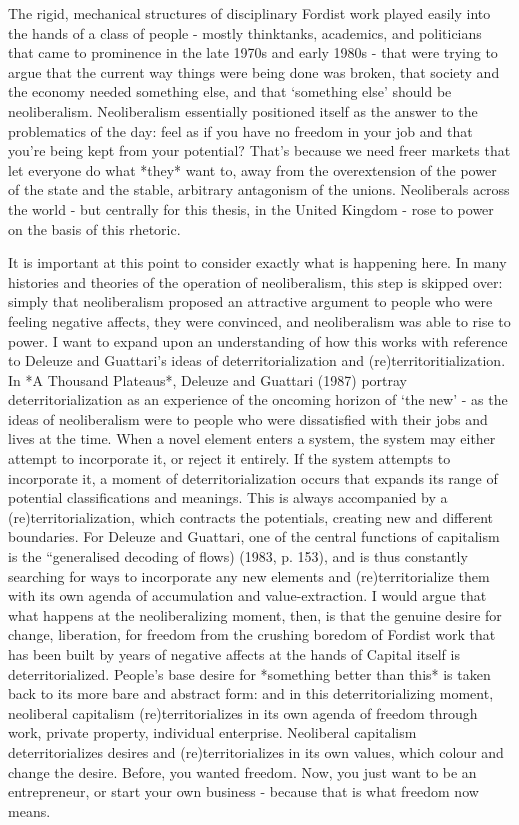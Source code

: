 The rigid, mechanical structures of disciplinary Fordist work played
easily into the hands of a class of people - mostly thinktanks,
academics, and politicians that came to prominence in the late 1970s and
early 1980s - that were trying to argue that the current way things were
being done was broken, that society and the economy needed something
else, and that `something else' should be neoliberalism. Neoliberalism
essentially positioned itself as the answer to the problematics of the
day: feel as if you have no freedom in your job and that you're being
kept from your potential? That's because we need freer markets that let
everyone do what *they* want to, away from the overextension of the
power of the state and the stable, arbitrary antagonism of the unions.
Neoliberals across the world - but centrally for this thesis, in the
United Kingdom - rose to power on the basis of this rhetoric.

It is important at this point to consider exactly what is happening
here. In many histories and theories of the operation of neoliberalism,
this step is skipped over: simply that neoliberalism proposed an
attractive argument to people who were feeling negative affects, they
were convinced, and neoliberalism was able to rise to power. I want to
expand upon an understanding of how this works with reference to Deleuze
and Guattari's ideas of deterritorialization and
(re)territoritialization. In *A Thousand Plateaus*, Deleuze and Guattari
(1987) portray deterritorialization as an experience of the oncoming
horizon of `the new' - as the ideas of neoliberalism were to people who
were dissatisfied with their jobs and lives at the time. When a novel
element enters a system, the system may either attempt to incorporate
it, or reject it entirely. If the system attempts to incorporate it, a
moment of deterritorialization occurs that expands its range of
potential classifications and meanings. This is always accompanied by a
(re)territorialization, which contracts the potentials, creating new and
different boundaries. For Deleuze and Guattari, one of the central
functions of capitalism is the ``generalised decoding of flows) (1983,
p. 153), and is thus constantly searching for ways to incorporate any
new elements and (re)territorialize them with its own agenda of
accumulation and value-extraction. I would argue that what happens at
the neoliberalizing moment, then, is that the genuine desire for change,
liberation, for freedom from the crushing boredom of Fordist work that
has been built by years of negative affects at the hands of Capital
itself is deterritorialized. People's base desire for *something better
than this* is taken back to its more bare and abstract form: and in this
deterritorializing moment, neoliberal capitalism (re)territorializes in
its own agenda of freedom through work, private property, individual
enterprise. Neoliberal capitalism deterritorializes desires and
(re)territorializes in its own values, which colour and change the
desire. Before, you wanted freedom. Now, you just want to be an
entrepreneur, or start your own business - because that is what freedom
now means.

